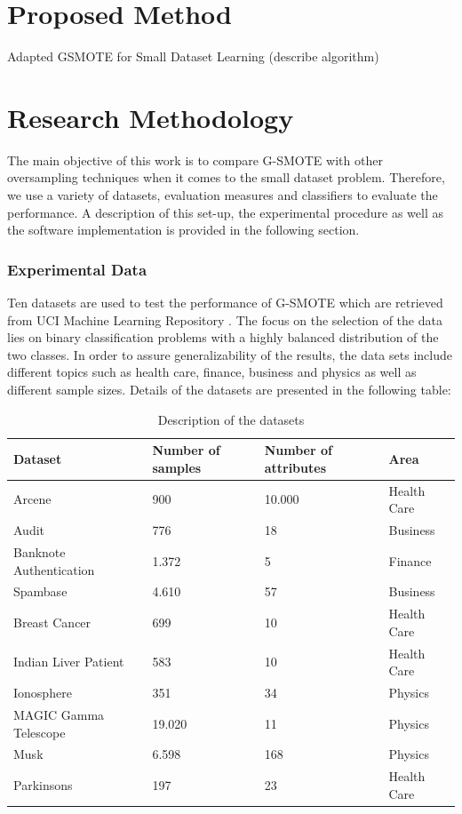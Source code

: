 \documentclass[parskip=full]{scrartcl}
\begin{document}
\section{Proposed Method}

Adapted GSMOTE for Small Dataset Learning (describe algorithm)

\section{Research Methodology}

The main objective of this work is to compare G-SMOTE with other oversampling techniques when it comes to the small dataset problem. Therefore, we use a variety of datasets, evaluation measures and classifiers to evaluate the performance. A description of this set-up, the experimental procedure as well as the software implementation is provided in the following section.

\subsubsection{Experimental Data}

Ten datasets are used to test the performance of G-SMOTE which are retrieved from UCI Machine Learning Repository \cite{Dua:2019}. The focus on the selection of the data lies on binary classification problems with a highly balanced distribution of the two classes. In order to assure generalizability of the results, the data sets include different topics such as health care, finance, business and physics as well as different sample sizes. Details of the datasets are presented in the following table:

\begin{table}
	\centering
	\begin{tabular}{|l|l|l|l|}
		\hline
		\textbf{Dataset} & \textbf{Number of samples} & \textbf{Number of attributes} & \textbf{Area} \\
		\hline
		Arcene & 900 & 10.000 & Health Care \\
		\hline
		Audit & 776 & 18 & Business \\
		\hline
		Banknote Authentication & 1.372 & 5 & Finance \\
		\hline
		Spambase & 4.610 & 57 & Business\\
		\hline
		Breast Cancer & 699 & 10 & Health Care\\
		\hline
		Indian Liver Patient & 583 & 10 & Health Care\\
		\hline
		Ionosphere & 351 & 34 & Physics\\
		\hline
		MAGIC Gamma Telescope & 19.020 & 11 & Physics\\
		\hline
		Musk & 6.598 & 168 & Physics\\
		\hline
		Parkinsons & 197 & 23 & Health Care\\
		\hline
	\end{tabular}
\caption{\label{tab:datasets}Description of the datasets}
\end{table}
\end{document}
